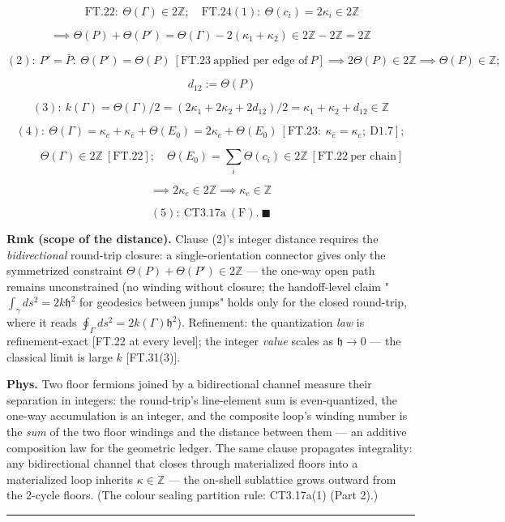 \begin{theorem}
\[
\qquad \mathrm{FT.22}:\ \Theta(\Gamma)\in2\mathbb Z;\quad\mathrm{FT.24}(1):\ \Theta(c_i)=2\kappa_i\in2\mathbb Z
\]

\[
\implies\Theta(P)+\Theta(P')=\Theta(\Gamma)-2(\kappa_1+\kappa_2)\in2\mathbb Z-2\mathbb Z=2\mathbb Z
\]

\[
(2):\ P'=\bar P:\ \Theta(P')=\Theta(P)\ [\mathrm{FT.23}\ \text{applied per edge of}\ P]\implies2\Theta(P)\in2\mathbb Z\implies\Theta(P)\in\mathbb Z;
\]

\[
\qquad d_{12}:=\Theta(P)
\]

\[
(3):\ k(\Gamma)=\Theta(\Gamma)/2=(2\kappa_1+2\kappa_2+2d_{12})/2=\kappa_1+\kappa_2+d_{12}\in\mathbb Z
\]

\[
(4):\ \Theta(\Gamma)=\kappa_e+\kappa_{\bar e}+\Theta(E_0)=2\kappa_e+\Theta(E_0)\ [\mathrm{FT.23}:\ \kappa_{\bar e}=\kappa_e;\ \mathrm{D1.7}];
\]

\[
\qquad \Theta(\Gamma)\in2\mathbb Z\ [\mathrm{FT.22}];\quad\Theta(E_0)=\sum_i\Theta(c_i)\in2\mathbb Z\ [\mathrm{FT.22}\ \text{per chain}]
\]

\[
\implies2\kappa_e\in2\mathbb Z\implies\kappa_e\in\mathbb Z
\]

\[
(5):\ \mathrm{CT3.17a}\ (\text{F}).\ \blacksquare
\]

\textbf{Rmk (scope of the distance).} Clause (2)'s integer distance requires the \textit{bidirectional} round-trip closure: a single-orientation connector gives only the symmetrized constraint $\Theta(P)+\Theta(P')\in2\mathbb Z$ — the one-way open path remains unconstrained (no winding without closure; the handoff-level claim "$\int_\gamma ds^2=2k\mathfrak h^2$ for geodesics between jumps" holds only for the closed round-trip, where it reads $\oint_\Gamma ds^2=2k(\Gamma)\mathfrak h^2$). Refinement: the quantization \textit{law} is refinement-exact [FT.22 at every level]; the integer \textit{value} scales as $\mathfrak h\to0$ — the classical limit is large $k$ [FT.31(3)].

\textbf{Phys.} Two floor fermions joined by a bidirectional channel measure their separation in integers: the round-trip's line-element sum is even-quantized, the one-way accumulation is an integer, and the composite loop's winding number is the \textit{sum} of the two floor windings and the distance between them — an additive composition law for the geometric ledger. The same clause propagates integrality: any bidirectional channel that closes through materialized floors into a materialized loop inherits $\kappa\in\mathbb Z$ — the on-shell sublattice grows outward from the 2-cycle floors. (The colour sealing partition rule: CT3.17a(1) (Part 2).)

\vspace{2pt}\noindent\rule{\textwidth}{0.4pt}\vspace{2pt}

\end{theorem}

